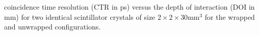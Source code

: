 \label{fig:ctrvsdoi} coincidence time resolution (CTR in ps) versus the depth of interaction (DOI in mm) for two identical scintillator crystals of size $2\times2\times30$mm$^3$ for the wrapped and unwrapped configurations.